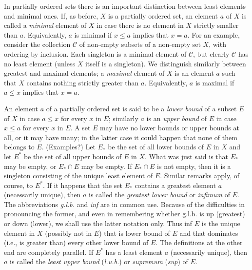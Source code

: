 In partially ordered sets there is an important distinction between least elements and minimal ones. If, as before, $X$ is a partially ordered set, an element $a$ of $X$ is called a \textit{minimal} element of $X$ in case there is no element in $X$ strictly smaller than $a$. Equivalently, $a$ is minimal if $x \le a$ implies that $x = a$. For an example, consider the collection $\mathcal{C}$ of non-empty subsets of a non-empty set $X$, with ordering by inclusion. Each singleton is a minimal element of $\mathcal{C}$, but clearly $\mathcal{C}$ has no least element (unless $X$ itself is a singleton). We distinguish similarly between greatest and maximal elements; a \textit{maximal} element of $X$ is an element $a$ such that $X$ contains nothing strictly greater than $a$. Equivalently, $a$ is maximal if $a \le x$ implies that $x = a$.
 
An element $a$ of a partially ordered set is said to be a \textit{lower bound} of a subset $E$ of $X$ in case $a \le x$ for every $x$ in $E$; similarly $a$ is an \textit{upper bound} of $E$ in case $x \le a$ for every $x$ in $E$. A set $E$ may have no lower bounds or upper bounds at all, or it may have many; in the latter case it could happen that none of them belongs to $E$. (Examples?) Let $E_{*}$ be the set of all lower bounds of $E$ in $X$ and let $E^{*}$ be the set of all upper bounds of $E$ in $X$. What was just said is that $E_{*}$ may be empty, or $E_{*} \cap E$ may be empty. If $E_{*} \cap E$ is not empty, then it is a singleton consisting of the unique least element of $E$. Similar remarks apply, of course, to $E^{*}$. If it happens that the set $E_{*}$ contains a greatest element $a$ (necessarily unique), then $a$ is called the \textit{greatest lower bound} or \textit{infimum} of $E$. The abbreviations \textit{g.l.b.} and \textit{inf} are in common use. Because of the difficulties in pronouncing the former, and even in remembering whether g.l.b. is up (greatest) or down (lower), we shall use the latter notation only. Thus inf $E$ is the unique element in $X$ (possibly not in $E$) that is lower bound of $E$ and that dominates (i.e., is greater than) every other lower bound of $E$. The definitions at the other end are completely parallel. If $E^{*}$ has a least element $a$ (necessarily unique), then $a$ is called the \textit{least upper bound} (\textit{l.u.b.}) or \textit{supremum} (\textit{sup}) of $E$. 

